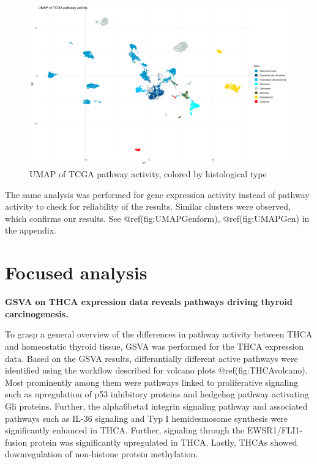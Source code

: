 \documentclass[
  parskip,
  oneside]{scrreprt}
\begin{document}
\begin{figure}

{\centering \includegraphics[width=0.8\linewidth]{figures/Pan Cancer UMAP cancer form} 

}

\caption{UMAP of TCGA pathway activity, colored by histological type}\label{fig:UMAPPanForm}
\end{figure}

The same analysis was performed for gene expression activity instead of
pathway activity to check for reliability of the results. Similar
clusters were observed, which confirms our results. See
@ref(fig:UMAPGenform), @ref(fig:UMAPGen) in the appendix.

\hypertarget{focused-analysis}{%
\section{Focused analysis}\label{focused-analysis}}

\textbf{GSVA on THCA expression data reveals pathways driving thyroid
carcinogenesis.}

To grasp a general overview of the differences in pathway activity
between THCA and homeostatic thyroid tissue, GSVA was performed for the
THCA expression data. Based on the GSVA results, differantially
different active pathways were identified using the workflow described
for volcano plots @ref(fig:THCAvolcano). Most prominently among them
were pathways linked to proliferative signaling such as upregulation of
p53 inhibitory proteins and hedgehog pathway activating Gli proteins.
Further, the alpha6beta4 integrin signaling pathway and associated
pathways such as IL-36 signaling and Typ I hemidesmosome synthesis were
significantly enhanced in THCA. Further, signaling through the
EWSR1/FLI1-fusion protein was significantly upregulated in THCA. Lastly,
THCAs showed downregulation of non-histone protein methylation.
\end{document}
